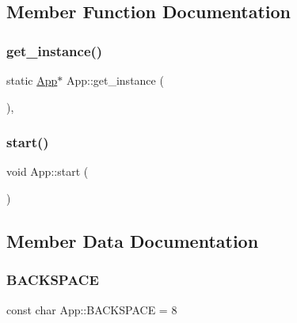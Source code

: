 \subsection{Member Function Documentation}
\mbox{\label{class_app_a86156f6cee97b06d3ab6ca6e47ea64e4}} 
\subsubsection{\texorpdfstring{get\_instance()}{get\_instance()}}
{\footnotesize\ttfamily static \mbox{\hyperlink{class_app}{App}}$\ast$ App\+::get\+\_\+instance (\begin{DoxyParamCaption}{ }\end{DoxyParamCaption})\hspace{0.3cm}{\ttfamily [inline]}, {\ttfamily [static]}}

\mbox{\label{class_app_a45e80958bad2ae75a2a152028a66021c}} 
\subsubsection{\texorpdfstring{start()}{start()}}
{\footnotesize\ttfamily void App\+::start (\begin{DoxyParamCaption}{ }\end{DoxyParamCaption})\hspace{0.3cm}{\ttfamily [inline]}}



\subsection{Member Data Documentation}
\mbox{\label{class_app_ad55056834cf494ee266b3cc6fa53e6d5}} 
\subsubsection{\texorpdfstring{BACKSPACE}{BACKSPACE}}
{\footnotesize\ttfamily const char App\+::\+B\+A\+C\+K\+S\+P\+A\+CE = 8\hspace{0.3cm}{\ttfamily [static]}}

\mbox{\label{class_app_a181d1f6b8675c1c8f198bb300f335f9c}} 
